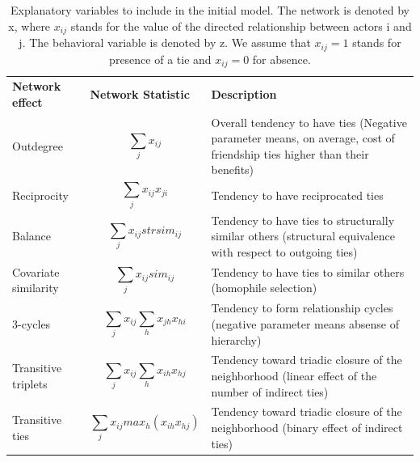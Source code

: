 \documentclass{report}
\begin{document}
\begin{table}[!ht]
\centering
\caption{Explanatory variables to include in the initial model. \cite{Steglich} The network is denoted by x, where $ x_{ij} $ stands for the value of the directed relationship between actors i and j. The behavioral variable is denoted by z. We assume that $ x_{ij} = 1 $ stands for presence of a tie and $ x_{ij} = 0 $ for absence. } 
\label{tableCovariates}
\begin{tabular}{m{} m{} m{}}
\hline\noalign{\smallskip}
\textbf{Network effect} & \textbf{Network Statistic} & \textbf{Description} \\
\noalign{\smallskip}\hline\noalign{\smallskip}
Outdegree & \begin{equation*} \sum_j x_{ij} \end{equation*} & Overall tendency to have ties (Negative parameter means, on average, cost of friendship ties higher than their benefits) \\ 
Reciprocity & \begin{equation*} \sum_j x_{ij} x_{ji} \end{equation*} & Tendency to have reciprocated ties \\ 
Balance & \begin{equation*} \sum_j x_{ij}strsim_{ij} \end{equation*} & Tendency to have ties to structurally similar others (structural equivalence with respect to outgoing ties) \\ 
Covariate similarity & \begin{equation*} \sum_j x_{ij} sim_{ij} \end{equation*} & Tendency to have ties to similar others (homophile selection) \\ 
3-cycles & \begin{equation*} \sum_j x_{ij} \sum_h x_{jh}x_{hi} \end{equation*} & Tendency to form relationship cycles (negative parameter means absense of hierarchy) \\
Transitive triplets & \begin{equation*} \sum_j x_{ij} \sum_h x_{ih}x_{hj} \end{equation*} &  Tendency toward triadic closure of the neighborhood (linear effect of the number of indirect ties) \\
Transitive ties & \begin{equation*} \sum_j x_{ij} max_h (x_{ih}x_{hj}) \end{equation*} & Tendency toward triadic closure of the neighborhood (binary effect of indirect ties) \\

\end{tabular}
\end{table}
\end{document}
